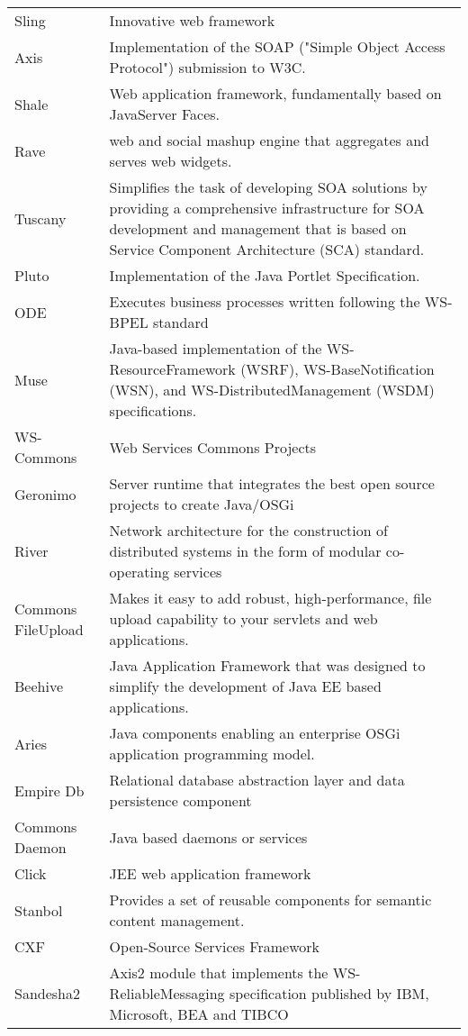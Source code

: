 {\begin{longtable}{|p{2cm} | p{14cm}|}
\\ Sling & Innovative web framework
\\ Axis & Implementation of the SOAP ("Simple Object Access Protocol") submission to W3C.
\\ Shale & Web application framework, fundamentally based on JavaServer Faces.
\\ Rave & web and social mashup engine that aggregates and serves web widgets.
\\ Tuscany &  Simplifies the task of developing SOA solutions by providing a comprehensive infrastructure for SOA development and management that is based on Service Component Architecture (SCA) standard.
\\ Pluto & Implementation of the Java Portlet Specification.
\\ ODE &  Executes business processes written following the WS-BPEL standard
\\ Muse & Java-based implementation of the WS-ResourceFramework (WSRF), WS-BaseNotification (WSN), and WS-DistributedManagement (WSDM) specifications.
\\ WS-Commons & Web Services Commons Projects
\\ Geronimo &  Server runtime that integrates the best open source projects to create Java/OSGi
\\ River & Network architecture for the construction of distributed systems in the form of modular co-operating services
\\ Commons FileUpload & Makes it easy to add robust, high-performance, file upload capability to your servlets and web applications.
\\ Beehive & Java Application Framework that was designed to simplify the development of Java EE based applications.
\\ Aries & Java components enabling an enterprise OSGi application programming model.
\\ Empire Db & Relational database abstraction layer and data persistence component
\\ Commons Daemon & Java based daemons or services
\\ Click & JEE web application framework
\\ Stanbol & Provides a set of reusable components for semantic content management.
\\ CXF & Open-Source Services Framework
\\ Sandesha2 &  Axis2 module that implements the WS-ReliableMessaging specification published by IBM, Microsoft, BEA and TIBCO

\end{longtable}}
